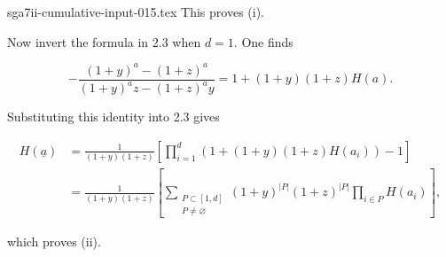 \begin{filecontents*}{sga7ii-cumulative-input-015.tex}
This proves (i).

Now invert the formula in 2.3 when $d=1$.  One finds

\begin{equation*}
-\frac{(1+y)^a-(1+z)^a}{(1+y)^az-(1+z)^ay}
=1+(1+y)(1+z)H(a).
\end{equation*}

Substituting this identity into 2.3 gives

\begin{align*}
H(\underline a)
&=\frac{1}{(1+y)(1+z)}\left[
\prod_{i=1}^d\left(1+(1+y)(1+z)H(a_i)\right)-1\right]\\
&=\frac{1}{(1+y)(1+z)}\left[
\sum_{\substack{P\subset[1,d]\\P\ne\varnothing}}
(1+y)^{|P|}(1+z)^{|P|}\prod_{i\in P}H(a_i)\right],
\end{align*}

which proves (ii).
\end{filecontents*}
